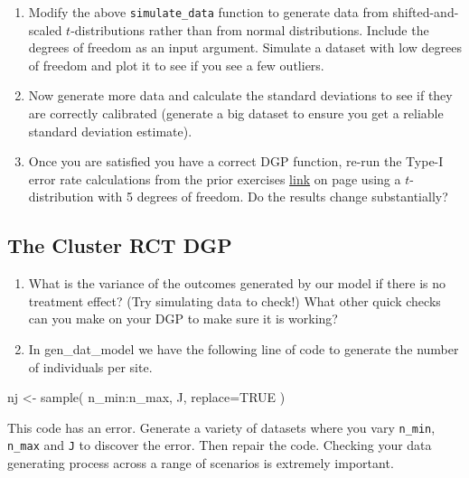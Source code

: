 \documentclass[
]{book}
\newenvironment{Shaded}{\begin{snugshade}}{\end{snugshade}}
\newcommand{\AttributeTok}[1]{\textcolor[rgb]{0.77,0.63,0.00}{#1}}
\newcommand{\ConstantTok}[1]{\textcolor[rgb]{0.00,0.00,0.00}{#1}}
\newcommand{\FunctionTok}[1]{\textcolor[rgb]{0.00,0.00,0.00}{#1}}
\newcommand{\NormalTok}[1]{#1}
\newcommand{\OtherTok}[1]{\textcolor[rgb]{0.56,0.35,0.01}{#1}}
\newcommand{\SpecialCharTok}[1]{\textcolor[rgb]{0.00,0.00,0.00}{#1}}
\begin{document}
\begin{enumerate}
\def\labelenumi{\arabic{enumi}.}
\item
  Modify the above \texttt{simulate\_data} function to generate data from shifted-and-scaled \(t\)-distributions rather than from normal distributions. Include the degrees of freedom as an input argument.
  Simulate a dataset with low degrees of freedom and plot it to see if you see a few outliers.
\item
  Now generate more data and calculate the standard deviations to see if they are correctly calibrated (generate a big dataset to ensure you get a reliable standard deviation estimate).
\item
  Once you are satisfied you have a correct DGP function, re-run the Type-I error rate calculations from the prior exercises \protect\hyperlink{exAnovaExercises}{link} on page \citet{exAnovaExercises} using a \(t\)-distribution with 5 degrees of freedom.
  Do the results change substantially?
\end{enumerate}

\hypertarget{the-cluster-rct-dgp}{%
\subsection{The Cluster RCT DGP}\label{the-cluster-rct-dgp}}

\begin{enumerate}
\def\labelenumi{\arabic{enumi}.}
\setcounter{enumi}{3}
\item
  What is the variance of the outcomes generated by our model if there is no treatment effect? (Try simulating data to check!) What other quick checks can you make on your DGP to make sure it is working?
\item
  In gen\_dat\_model we have the following line of code to generate the number of individuals per site.
\end{enumerate}

\begin{Shaded}
\begin{Highlighting}[]
\NormalTok{nj }\OtherTok{\textless{}{-}} \FunctionTok{sample}\NormalTok{( n\_min}\SpecialCharTok{:}\NormalTok{n\_max, J, }
                 \AttributeTok{replace=}\ConstantTok{TRUE}\NormalTok{ )}
\end{Highlighting}
\end{Shaded}

This code has an error. Generate a variety of datasets where you vary \texttt{n\_min}, \texttt{n\_max} and \texttt{J} to discover the error. Then repair the code.
Checking your data generating process across a range of scenarios is extremely important.
\end{document}

